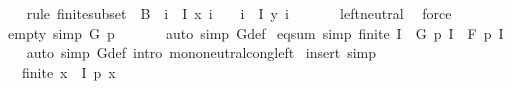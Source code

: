 \begin{isabellebody}
%
\isadelimproof
\ \ %
\endisadelimproof
%
\isatagproof
{}\isamarkupfalse%
\ {\isacharparenleft}{\kern0pt}rule\ finite{\isacharunderscore}{\kern0pt}subset\ {\isacharbrackleft}{\kern0pt}\ B\ {\isacharequal}{\kern0pt}\ {\isachardoublequoteopen}{\isacharbraceleft}{\kern0pt}i\ {\isasymin}\ I{\isachardot}{\kern0pt}\ x\ i\ {\isasymnoteq}\ \ {\isasymunion}\ {\isacharbraceleft}{\kern0pt}i\ {\isasymin}\ I{\isachardot}{\kern0pt}\ y\ i\ {\isasymnoteq}\ \ \isanewline
\ \ \isamarkupfalse%
\ left{\isacharunderscore}{\kern0pt}neutral\ \isamarkupfalse%
\ force{\isacharplus}{\kern0pt}%
\endisatagproof
{\isafoldproof}%
%
\isadelimproof
\isanewline
%
\endisadelimproof
\isanewline
{}\isamarkupfalse%
\ empty{\isacharprime}{\kern0pt}\ {\isacharbrackleft}{\kern0pt}simp{\isacharbrackright}{\kern0pt}{\isacharcolon}{\kern0pt}\ {\isachardoublequoteopen}G\ p\ {\isacharbraceleft}{\kern0pt}{\isacharbraceright}{\kern0pt}\ {\isacharequal}{\kern0pt}\ \isanewline
%
\isadelimproof
\ \ %
\endisadelimproof
%
\isatagproof
{}\isamarkupfalse%
\ {\isacharparenleft}{\kern0pt}auto\ simp{\isacharcolon}{\kern0pt}\ G{\isacharunderscore}{\kern0pt}def{\isacharparenright}{\kern0pt}%
\endisatagproof
{\isafoldproof}%
%
\isadelimproof
\isanewline
%
\endisadelimproof
\isanewline
{}\isamarkupfalse%
\ eq{\isacharunderscore}{\kern0pt}sum\ {\isacharbrackleft}{\kern0pt}simp{\isacharbrackright}{\kern0pt}{\isacharcolon}{\kern0pt}\ {\isachardoublequoteopen}finite\ I\ {\isasymLongrightarrow}\ G\ p\ I\ {\isacharequal}{\kern0pt}\ F\ p\ I{\isachardoublequoteclose}\isanewline
%
\isadelimproof
\ \ %
\endisadelimproof
%
\isatagproof
{}\isamarkupfalse%
\ {\isacharparenleft}{\kern0pt}auto\ simp{\isacharcolon}{\kern0pt}\ G{\isacharunderscore}{\kern0pt}def\ intro{\isacharcolon}{\kern0pt}\ mono{\isacharunderscore}{\kern0pt}neutral{\isacharunderscore}{\kern0pt}cong{\isacharunderscore}{\kern0pt}left{\isacharparenright}{\kern0pt}%
\endisatagproof
{\isafoldproof}%
%
\isadelimproof
\isanewline
%
\endisadelimproof
\isanewline
{}\isamarkupfalse%
\ insert{\isacharprime}{\kern0pt}\ {\isacharbrackleft}{\kern0pt}simp{\isacharbrackright}{\kern0pt}{\isacharcolon}{\kern0pt}\isanewline
\ \ \ {\isachardoublequoteopen}finite\ {\isacharbraceleft}{\kern0pt}x\ {\isasymin}\ I{\isachardot}{\kern0pt}\ p\ x\ {\isasymnoteq}\ \isanewline

\end{isabellebody}
